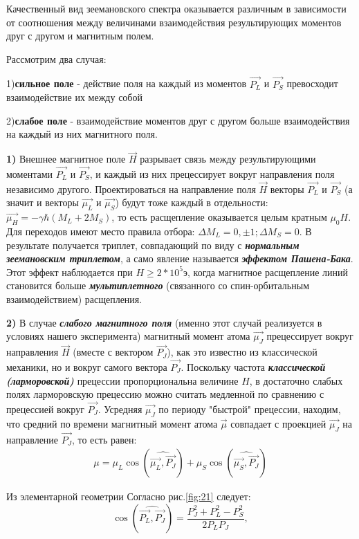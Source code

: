 Качественный вид зеемановского спектра оказывается различным в зависимости от соотношения между величинами взаимодействия результирующих моментов друг с другом и магнитным полем.

Рассмотрим два случая:

1)\textbf{сильное поле} - действие поля на каждый из моментов $\vec{P_L}$ и $\vec{P_S}$ превосходит взаимодействие их между собой

2)\textbf{слабое поле} - взаимодействие моментов друг с другом больше взаимодействия на каждый из них магнитного поля.

\textbf{1)} Внешнее магнитное поле $\vec{H}$ разрывает связь между результирующими моментами $\vec{P_L}$ и $\vec{P_S}$, и каждый из них прецессирует вокруг направления поля независимо другого. Проектироваться на направление поля $\vec{H}$ векторы $\vec{P_L}$ и $\vec{P_S}$ (а значит и векторы $\vec{\mu_L}$ и $\vec{\mu_S}$) будут тоже каждый в отдельности: $\vec{\mu_H}=-\gamma \hbar(M_L+2M_S)$, то есть расщепление оказывается целым кратным $\mu_0 H$. Для переходов имеют место правила отбора: $\Delta M_L=0,\pm 1; \Delta M_S=0.$ В результате получается триплет, совпадающий по виду с {\itshape\textbf{нормальным зеемановским триплетом}}, а само явление называется {\itshape\textbf{эффектом Пашена-Бака}}. Этот эффект наблюдается при $H\geq 2*10^5 \text{э}$, когда магнитное расщепление линий становится больше {\itshape\textbf{мультиплетного}} (связанного со спин-орбитальным взаимодействием) расщепления.

\textbf{2)} В случае {\itshape\textbf{слабого магнитного поля}} (именно этот случай реализуется в условиях нашего эксперимента) магнитный момент атома $\vec{\mu_J}$ прецессирует вокруг направления $\vec{H}$ (вместе с вектором $\vec{P_J}$), как это известно из классической механики, но и вокруг самого вектора $\vec{P_J}$. Поскольку частота {\itshape\textbf{классической (ларморовской)}} прецессии пропорциональна величине $H$, в достаточно слабых полях ларморовскую прецессию можно считать медленной по сравнению с прецессией вокруг $\vec{P_J}$. Усредняя $\vec{\mu_J}$ по периоду "быстрой" прецессии, находим, что средний по времени магнитный момент атома $\vec{\mu}$ совпадает с проекцией $\vec{\mu_J}$ на направление $\vec{P_J}$, то есть равен: 
\begin{gather} 
\label{eq:18} 
\mu=\mu_L \cos(\widehat{\vec{\mu_L},\vec{P_J}})+\mu_S \cos(\widehat{\vec{\mu_S},\vec{P_J}})
\end{gather}

Из элементарной геометрии Согласно рис.\ref{fig:21} следует:
\begin{equation} 
\label{eq:19a} 
\cos(\widehat{\vec{P_L},\vec{P_J}})=\frac{P_J^2+P_L^2-P_S^2}{2P_L P_J},
\end{equation}

